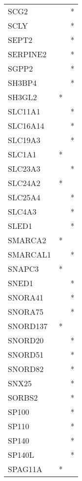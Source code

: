 \begin{longtable}{lcc}
SCG2           &           &       * \\
SCLY           &           &       * \\
SEPT2          &           &       * \\
SERPINE2       &           &       * \\
SGPP2          &           &       * \\
SH3BP4         &           &       * \\
SH3GL2         &         * &         \\
SLC11A1        &           &       * \\
SLC16A14       &           &       * \\
SLC19A3        &           &       * \\
SLC1A1         &         * &         \\
SLC23A3        &           &       * \\
SLC24A2        &         * &         \\
SLC25A4        &           &       * \\
SLC4A3         &           &       * \\
SLED1          &           &       * \\
SMARCA2        &         * &         \\
SMARCAL1       &           &       * \\
SNAPC3         &         * &         \\
SNED1          &           &       * \\
SNORA41        &           &       * \\
SNORA75        &           &       * \\
SNORD137       &         * &         \\
SNORD20        &           &       * \\
SNORD51        &           &       * \\
SNORD82        &           &       * \\
SNX25          &           &       * \\
SORBS2         &           &       * \\
SP100          &           &       * \\
SP110          &           &       * \\
SP140          &           &       * \\
SP140L         &           &       * \\
SPAG11A        &         * &         \\

\end{longtable}
